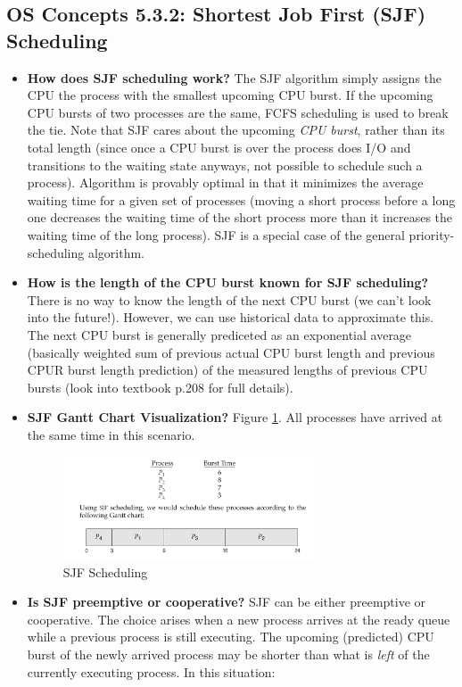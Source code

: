\documentclass[12pt]{article}
\begin{document}
\subsection*{OS Concepts 5.3.2: Shortest Job First (SJF) Scheduling}

\begin{itemize}
    \item \textbf{How does SJF scheduling work?} The SJF algorithm simply assigns the CPU the process with the smallest upcoming CPU burst. If the upcoming CPU bursts of two processes are the same, FCFS scheduling is used to break the tie. Note that SJF cares about the upcoming \textit{CPU burst}, rather than its total length (since once a CPU burst is over the process does I/O and transitions to the waiting state anyways, not possible to schedule such a process). Algorithm is provably optimal in that it minimizes the average waiting time for a given set of processes (moving a short process before a long one decreases the waiting time of the short process more than it increases the waiting time of the long process). SJF is a special case of the general priority-scheduling algorithm.
    \item \textbf{How is the length of the CPU burst known for SJF scheduling?} There is no way to know the length of the next CPU burst (we can't look into the future!). However, we can use historical data to approximate this. The next CPU burst is generally prediceted as an exponential average (basically weighted sum of previous actual CPU burst length and previous CPUR burst length prediction) of the measured lengths of previous CPU bursts (look into textbook p.208 for full details).
    \item \textbf{SJF Gantt Chart Visualization?} Figure \ref{fig:sjf-scheduling}. All processes have arrived at the same time in this scenario.
        \begin{figure}[ht]
            \centering
            \includegraphics[width=0.7\textwidth]{figures/sjf-scheduling.jpg}
            \caption{SJF Scheduling}
            \label{fig:sjf-scheduling}
        \end{figure}
    \item \textbf{Is SJF preemptive or cooperative?} SJF can be either preemptive or cooperative. The choice arises when a new process arrives at the ready queue while a previous process is still executing. The upcoming (predicted) CPU burst of the newly arrived process may be shorter than what is \textit{left} of the currently executing process. In this situation:

\end{itemize}
\end{document}
